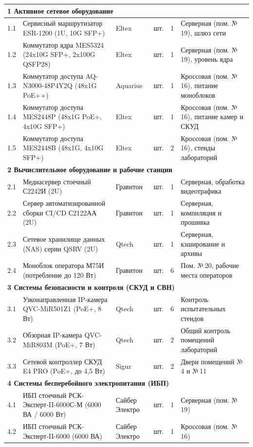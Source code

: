 \documentclass[a4paper,oneside,14pt]{extreport}
\begin{document}
\begin{appendices}
\begin{small}
\begin{longtable}{|c|p{4.6cm}|p{3.1cm}|c|c|p{3.4cm}|}
\multicolumn{6}{|l|}{\textbf{1 Активное сетевое оборудование}} \\
\hline
1.1 & Сервисный маршрутизатор ESR-1200 (1U, 10G SFP+) & Eltex & шт. & 1 & Серверная (пом. №\,19), шлюз сети \\
\hline
1.2 & Коммутатор ядра MES5324 (24x10G SFP+, 2x100G QSFP28) & Eltex & шт. & 1 & Серверная (пом. №\,19), уровень ядра \\
\hline
1.3 & Коммутатор доступа AQ-N3000-48P4Y2Q (48x1G PoE++) & Aquarius & шт. & 1 & Кроссовая (пом. №\,16), питание моноблоков \\
\hline
1.4 & Коммутатор доступа MES2448P (48x1G PoE+, 4x10G SFP+) & Eltex & шт. & 1 & Кроссовая (пом. №\,16), питание камер и СКУД \\
\hline
1.5 & Коммутатор доступа MES2448B (48x1G, 4x10G SFP+) & Eltex & шт. & 2 & Кроссовая (пом. №\,16), стенды лабораторий \\
\hline
\multicolumn{6}{|l|}{\textbf{2 Вычислительное оборудование и рабочие станции}} \\
\hline
2.1 & Медиасервер стоечный С2242И (2U) & Гравитон & шт. & 1 & Серверная, обработка видеотрафика \\
\hline
2.2 & Сервер автоматизированной сборки CI/CD С2122АА (2U) & Гравитон & шт. & 1 & Серверная, компиляция и прошивка \\
\hline
2.3 & Сетевое хранилище данных (NAS) серии QSRV (2U) & Qtech & шт. & 1 & Серверная, кэширование и архивы \\
\hline
2.4 & Моноблок оператора М75И (потребление до 120 Вт) & Гравитон & шт. & 6 & Пом. №\,20, рабочие места операторов \\
\hline
\multicolumn{6}{|l|}{\textbf{3 Системы безопасности и контроля (СКУД и СВН)}} \\
\hline
3.1 & Узконаправленная IP-камера QVC-MiR501Z1 (PoE+, 8 Вт) & Qtech & шт. & 6 & Контроль испытательных стендов \\
\hline
3.2 & Обзорная IP-камера QVC-MiR803M (PoE+, 7 Вт) & Qtech & шт. & 2 & Общий контроль помещений лабораторий \\
\hline
3.3 & Сетевой контроллер СКУД E4 PRO (PoE+, до 4,5 Вт) & Sigur & шт. & 2 & Двери помещений №\,4 и №\,11 \\
\hline
\multicolumn{6}{|l|}{\textbf{4 Системы бесперебойного электропитания (ИБП)}} \\
\hline
4.1 & ИБП стоечный РСК-Эксперт-II-6000С-М (6000 ВА / 6000 Вт) & Сайбер Электро & шт. & 1 & Серверная (пом. №\,19) \\
\hline
4.2 & ИБП стоечный РСК-Эксперт-II-6000 (6000 ВА) & Сайбер Электро & шт. & 1 & Кроссовая (пом. №\,16) \\

\end{longtable}
\end{small}
\end{appendices}
\end{document}
